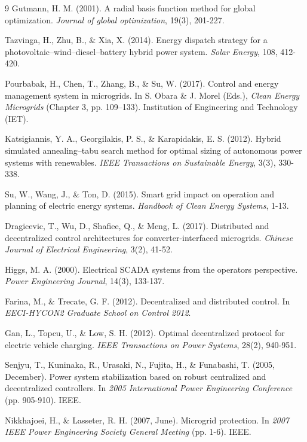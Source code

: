\documentclass[final,3p,times]{elsarticle}
\begin{document}
\begin{thebibliography}{9}
Gutmann, H. M. (2001). A radial basis function method for global optimization. \textit{Journal of global optimization}, 19(3), 201-227.

Tazvinga, H., Zhu, B., \& Xia, X. (2014). Energy dispatch strategy for a photovoltaic–wind–diesel–battery hybrid power system. \textit{Solar Energy}, 108, 412-420.

Pourbabak, H., Chen, T., Zhang, B., \& Su, W. (2017). Control and energy management system in microgrids. In S. Obara \& J. Morel (Eds.), \textit{Clean Energy Microgrids} (Chapter 3, pp. 109--133). Institution of Engineering and Technology (IET).

Katsigiannis, Y. A., Georgilakis, P. S., \& Karapidakis, E. S. (2012). Hybrid simulated annealing–tabu search method for optimal sizing of autonomous power systems with renewables. \textit{IEEE Transactions on Sustainable Energy}, 3(3), 330-338.

Su, W., Wang, J., \& Ton, D. (2015). Smart grid impact on operation and planning of electric energy systems. \textit{Handbook of Clean Energy Systems}, 1-13.

Dragicevic, T., Wu, D., Shafiee, Q., \& Meng, L. (2017). Distributed and decentralized control architectures for converter-interfaced microgrids. \textit{Chinese Journal of Electrical Engineering}, 3(2), 41-52.

Higgs, M. A. (2000). Electrical SCADA systems from the operators perspective. \textit{Power Engineering Journal}, 14(3), 133-137.

Farina, M., \& Trecate, G. F. (2012). Decentralized and distributed control. In \textit{EECI-HYCON2 Graduate School on Control 2012}.

Gan, L., Topcu, U., \& Low, S. H. (2012). Optimal decentralized protocol for electric vehicle charging. \textit{IEEE Transactions on Power Systems}, 28(2), 940-951.

Senjyu, T., Kuninaka, R., Urasaki, N., Fujita, H., \& Funabashi, T. (2005, December). Power system stabilization based on robust centralized and decentralized controllers. In \textit{2005 International Power Engineering Conference} (pp. 905-910). IEEE.

Nikkhajoei, H., \& Lasseter, R. H. (2007, June). Microgrid protection. In \textit{2007 IEEE Power Engineering Society General Meeting} (pp. 1-6). IEEE.


\end{thebibliography}
\end{document}
